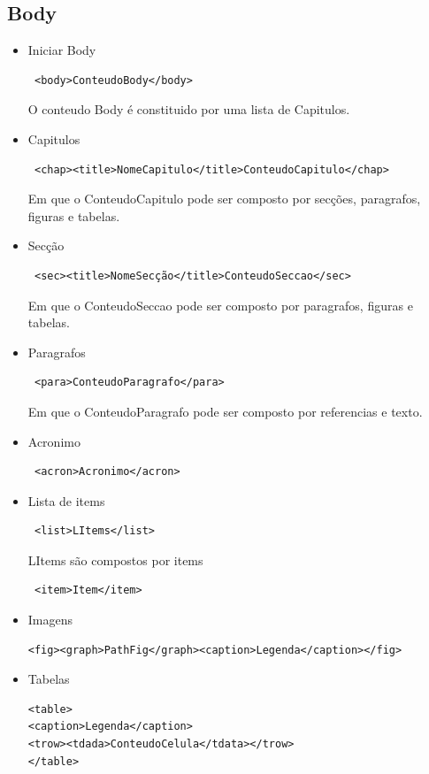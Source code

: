 \documentclass{report}
\begin{document}
\subsection{Body}
\begin{itemize}
\item Iniciar Body
\begin{verbatim} <body>ConteudoBody</body> \end{verbatim}
O conteudo Body é constituido por uma lista de Capitulos.
\item Capitulos
\begin{verbatim} <chap><title>NomeCapitulo</title>ConteudoCapitulo</chap> \end{verbatim} 
Em que o ConteudoCapitulo pode ser composto por secções, paragrafos, figuras e tabelas.
\item Secção
\begin{verbatim} <sec><title>NomeSecção</title>ConteudoSeccao</sec> \end{verbatim} 
Em que o ConteudoSeccao pode ser composto por paragrafos, figuras e tabelas.
\item Paragrafos
\begin{verbatim} <para>ConteudoParagrafo</para> \end{verbatim} 
Em que o ConteudoParagrafo pode ser composto por referencias e texto.

\item Acronimo
\begin{verbatim} <acron>Acronimo</acron> \end{verbatim} 

\item Lista de items
\begin{verbatim} <list>LItems</list> \end{verbatim}
LItems são compostos por items 
\begin{verbatim} <item>Item</item> \end{verbatim}

\item Imagens
\begin{verbatim}<fig><graph>PathFig</graph><caption>Legenda</caption></fig>\end{verbatim}

\item Tabelas

\begin{verbatim}
<table>
<caption>Legenda</caption>
<trow><tdada>ConteudoCelula</tdata></trow>
</table>
\end{verbatim}
\end{itemize}
\end{document}
